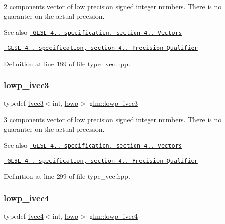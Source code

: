 2 components vector of low precision signed integer numbers. There is no guarantee on the actual precision.

\begin{DoxySeeAlso}{See also}
\href{http://www.opengl.org/registry/doc/GLSLangSpec.4.20.8.pdf}{\texttt{ G\+L\+SL 4.. specification, section 4.. Vectors}} 

\href{http://www.opengl.org/registry/doc/GLSLangSpec.4.20.8.pdf}{\texttt{ G\+L\+SL 4.. specification, section 4.. Precision Qualifier}} 
\end{DoxySeeAlso}


Definition at line 189 of file type\+\_\+vec.\+hpp.

\mbox{\label{group__core__precision_gad03cd497aea76c671fda2ce1d697e905}} 
\subsubsection{\texorpdfstring{lowp\_ivec3}{lowp\_ivec3}}
{\footnotesize\ttfamily typedef \mbox{\hyperlink{structglm_1_1tvec3}{tvec3}}$<$int, \mbox{\hyperlink{namespaceglm_a0f04f086094c747d227af4425893f545ae161af3fc695e696ce3bf69f7332bc2d}{lowp}}$>$ \mbox{\hyperlink{group__core__precision_gad03cd497aea76c671fda2ce1d697e905}{glm\+::lowp\+\_\+ivec3}}}

3 components vector of low precision signed integer numbers. There is no guarantee on the actual precision.

\begin{DoxySeeAlso}{See also}
\href{http://www.opengl.org/registry/doc/GLSLangSpec.4.20.8.pdf}{\texttt{ G\+L\+SL 4.. specification, section 4.. Vectors}} 

\href{http://www.opengl.org/registry/doc/GLSLangSpec.4.20.8.pdf}{\texttt{ G\+L\+SL 4.. specification, section 4.. Precision Qualifier}} 
\end{DoxySeeAlso}


Definition at line 299 of file type\+\_\+vec.\+hpp.

\mbox{\label{group__core__precision_ga863ce958bb6c85ab934feeb4a0da5821}} 
\subsubsection{\texorpdfstring{lowp\_ivec4}{lowp\_ivec4}}
{\footnotesize\ttfamily typedef \mbox{\hyperlink{structglm_1_1tvec4}{tvec4}}$<$int, \mbox{\hyperlink{namespaceglm_a0f04f086094c747d227af4425893f545ae161af3fc695e696ce3bf69f7332bc2d}{lowp}}$>$ \mbox{\hyperlink{group__core__precision_ga863ce958bb6c85ab934feeb4a0da5821}{glm\+::lowp\+\_\+ivec4}}}

